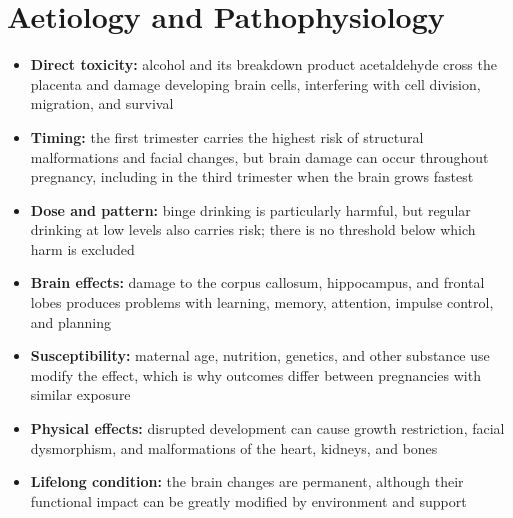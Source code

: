 \section*{Aetiology and Pathophysiology}
\begin{itemize}
    \item \textbf{Direct toxicity:} alcohol and its breakdown product acetaldehyde cross the placenta and damage developing brain cells, interfering with cell division, migration, and survival
    \item \textbf{Timing:} the first trimester carries the highest risk of structural malformations and facial changes, but brain damage can occur throughout pregnancy, including in the third trimester when the brain grows fastest
    \item \textbf{Dose and pattern:} binge drinking is particularly harmful, but regular drinking at low levels also carries risk; there is no threshold below which harm is excluded
    \item \textbf{Brain effects:} damage to the corpus callosum, hippocampus, and frontal lobes produces problems with learning, memory, attention, impulse control, and planning
    \item \textbf{Susceptibility:} maternal age, nutrition, genetics, and other substance use modify the effect, which is why outcomes differ between pregnancies with similar exposure
    \item \textbf{Physical effects:} disrupted development can cause growth restriction, facial dysmorphism, and malformations of the heart, kidneys, and bones
    \item \textbf{Lifelong condition:} the brain changes are permanent, although their functional impact can be greatly modified by environment and support
\end{itemize}


